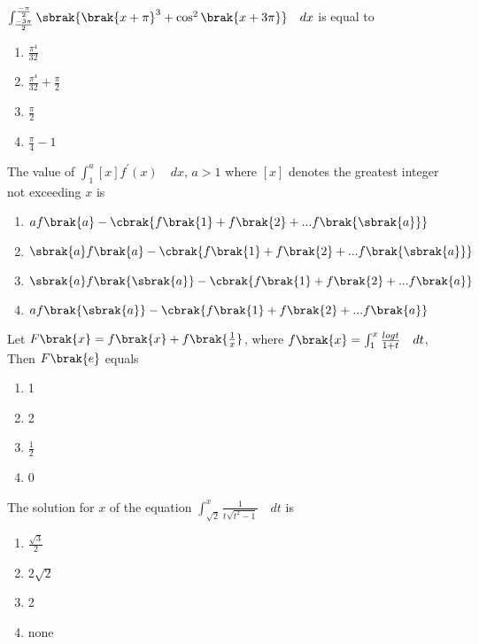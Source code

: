 	     \item
		    $\int_{\frac{-3\pi}{2}}^{\frac{-\pi}{2}} \sbrak{\brak{x+\pi}^{3}+\cos^{2}\brak{x+3\pi}} \quad dx$ is equal to
		    \hfill {} 
		   \begin{enumerate}
		        \item $\frac{\pi^{4}}{32}$
		        \item $\frac{\pi^{4}}{32}+\frac{\pi}{2}$
		        \item $\frac{\pi}{2}$
		        \item $\frac{\pi}{4}-1$
		   \end{enumerate}
	    \item
		    The value of $\int_{1}^{a} [x]f^{\prime}(x) \quad dx$, $a>1$ where $[x]$ denotes the greatest integer not exceeding $x$ is
		   \hfill {}
		   \begin{enumerate}
		       \item $af\brak{a}-\cbrak{f\brak{1}+f\brak{2}+...f\brak{\sbrak{a}}}$
		       \item $\sbrak{a}f\brak{a}-\cbrak{f\brak{1}+f\brak{2}+...f\brak{\sbrak{a}}}$
		       \item $\sbrak{a}f\brak{\sbrak{a}}-\cbrak{f\brak{1}+f\brak{2}+...f\brak{a}}$
		       \item $af\brak{\sbrak{a}}-\cbrak{f\brak{1}+f\brak{2}+...f\brak{a}}$
		   \end{enumerate}
	   \item 
		    Let $F\brak{x}=f\brak{x}+f\brak{\frac{1}{x}}$, where $f\brak{x}=\int_{1}^{x} \frac{logt}{1+t} \quad dt$, Then $F\brak{e}$ equals
		    \hfill {} 
		   \begin{enumerate}
		      \item 1
		      \item 2
		      \item $\frac{1}{2}$
		      \item 0
		   \end{enumerate}  
	   \item 
    		    The solution for $x$ of the equation $\int_{\sqrt2}^{x} \frac{1}{t\sqrt{t^{2}-1}} \quad dt$ is
    		   \hfill {}
		   \begin{enumerate}
		      \item $\frac{\sqrt{3}}{2}$
		      \item $2\sqrt{2}$
		      \item 2
		      \item none
		   \end{enumerate} 
	   \item 
